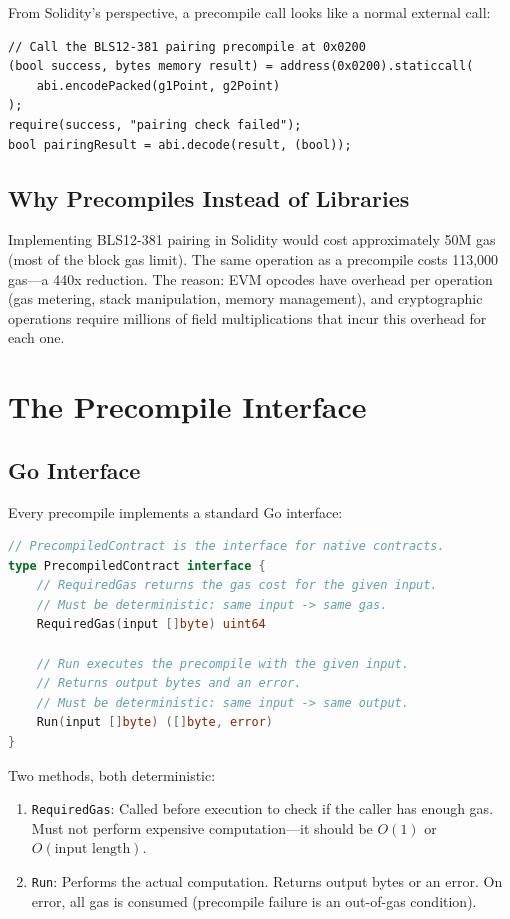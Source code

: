 \documentclass[11pt,a4paper]{article}
\begin{document}
From Solidity's perspective, a precompile call looks like a normal external call:

\begin{lstlisting}[language=Solidity,caption={Calling a precompile from Solidity}]
// Call the BLS12-381 pairing precompile at 0x0200
(bool success, bytes memory result) = address(0x0200).staticcall(
    abi.encodePacked(g1Point, g2Point)
);
require(success, "pairing check failed");
bool pairingResult = abi.decode(result, (bool));
\end{lstlisting}

\subsection{Why Precompiles Instead of Libraries}

Implementing BLS12-381 pairing in Solidity would cost approximately 50M gas (most of the
block gas limit). The same operation as a precompile costs 113,000 gas---a 440x reduction.
The reason: EVM opcodes have overhead per operation (gas metering, stack manipulation,
memory management), and cryptographic operations require millions of field multiplications
that incur this overhead for each one.

\section{The Precompile Interface}

\subsection{Go Interface}

Every precompile implements a standard Go interface:

\begin{lstlisting}[language=Go,caption={The precompile interface}]
// PrecompiledContract is the interface for native contracts.
type PrecompiledContract interface {
    // RequiredGas returns the gas cost for the given input.
    // Must be deterministic: same input -> same gas.
    RequiredGas(input []byte) uint64

    // Run executes the precompile with the given input.
    // Returns output bytes and an error.
    // Must be deterministic: same input -> same output.
    Run(input []byte) ([]byte, error)
}
\end{lstlisting}

Two methods, both deterministic:
\begin{enumerate}[nosep]
  \item \texttt{RequiredGas}: Called before execution to check if the caller has enough gas.
    Must not perform expensive computation---it should be $O(1)$ or $O(\text{input length})$.
  \item \texttt{Run}: Performs the actual computation. Returns output bytes or an error.
    On error, all gas is consumed (precompile failure is an out-of-gas condition).
\end{enumerate}
\end{document}
